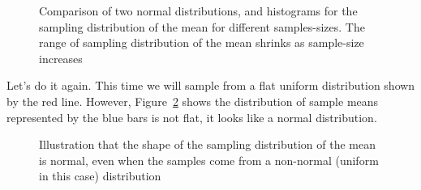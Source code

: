 \documentclass[
  letterpaper,
  DIV=11,
  numbers=noendperiod]{scrreprt}
\begin{document}
\begin{figure}


\caption{\label{fig-4sampledistmeannorm}Comparison of two normal
distributions, and histograms for the sampling distribution of the mean
for different samples-sizes. The range of sampling distribution of the
mean shrinks as sample-size increases}

\end{figure}%

Let's do it again. This time we will sample from a flat uniform
distribution shown by the red line. However,
Figure~\ref{fig-4samplemeanunif} shows the distribution of sample means
represented by the blue bars is not flat, it looks like a normal
distribution.

\begin{figure}


\caption{\label{fig-4samplemeanunif}Illustration that the shape of the
sampling distribution of the mean is normal, even when the samples come
from a non-normal (uniform in this case) distribution}

\end{figure}%
\end{document}
